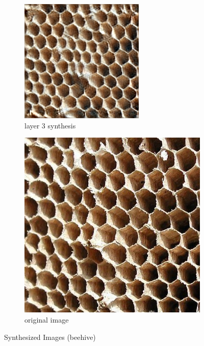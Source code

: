 \documentclass[11pt, oneside]{article}   	%
\begin{document}
\begin{figure}[H]
    \begin{subfigure}[b]{0.45\textwidth}
        \includegraphics[width=\textwidth]{figure/beehive/layer_03_001}
        \caption{layer 3 synthesis}
    \end{subfigure}
        \begin{subfigure}[b]{0.45\textwidth}
        \includegraphics[width=\textwidth]{figure/beehive/layer_00_001}
        \caption{original image}
    \end{subfigure}
    \caption{Synthesized Images (beehive)}\label{fig:beehives}
\end{figure}
\end{document}
